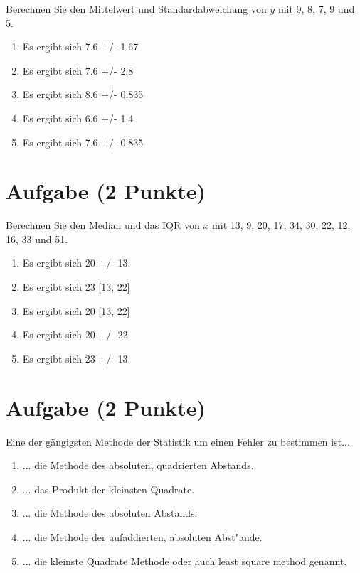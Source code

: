 \documentclass[a4paper, 10pt]{scrartcl}\usepackage[]{graphicx}\usepackage[]{color}
\begin{document}
Berechnen Sie den Mittelwert und Standardabweichung von $y$ mit 9, 8, 7, 9 und 5.



\begin{enumerate}
\item [\textbf{A} \msquare] Es ergibt sich 7.6 +/- 1.67
\item [\textbf{B} \msquare] Es ergibt sich 7.6 +/- 2.8
\item [\textbf{C} \msquare] Es ergibt sich 8.6 +/- 0.835
\item [\textbf{D} \msquare] Es ergibt sich 6.6 +/- 1.4
\item [\textbf{E} \msquare] Es ergibt sich 7.6 +/- 0.835
\end{enumerate}

\section{Aufgabe \hfill (2 Punkte)}




Berechnen Sie den Median und das IQR von $x$ mit 13, 9, 20, 17, 34, 30, 22, 12, 16, 33 und 51.



\begin{enumerate}
\item [\textbf{A} \msquare] Es ergibt sich 20 +/- 13
\item [\textbf{B} \msquare] Es ergibt sich 23 [13, 22]
\item [\textbf{C} \msquare] Es ergibt sich 20 [13, 22]
\item [\textbf{D} \msquare] Es ergibt sich 20 +/- 22
\item [\textbf{E} \msquare] Es ergibt sich 23 +/- 13
\end{enumerate} 

\section{Aufgabe \hfill (2 Punkte)}

Eine der g{\"a}ngigsten Methode der Statistik um einen Fehler zu bestimmen ist...



\begin{enumerate}
\item [\textbf{A} \msquare] ... die Methode des absoluten, quadrierten Abstands.
\item [\textbf{B} \msquare] ... das Produkt der kleinsten Quadrate.
\item [\textbf{C} \msquare] ... die Methode des absoluten Abstands.
\item [\textbf{D} \msquare] ... die Methode der aufaddierten, absoluten Abst{"a}nde.
\item [\textbf{E} \msquare] ... die kleinste Quadrate Methode oder auch least square method genannt.
\end{enumerate} 
\end{document}
